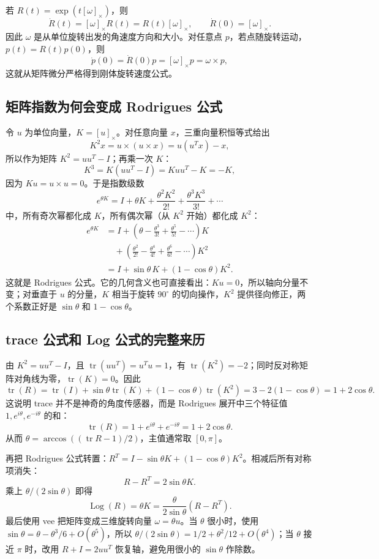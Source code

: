 \documentclass[UTF8,a4paper,11pt]{ctexart}
\newcommand{\Log}{\operatorname{Log}}
\newcommand{\hatmat}[1]{\left[#1\right]_{\times}}
\begin{document}
若 $R(t)=\exp(t\hatmat{\omega})$，则
\[
\dot R(t)=\hatmat{\omega}R(t)=R(t)\hatmat{\omega},
\qquad \dot R(0)=\hatmat{\omega}.
\]
因此 $\omega$ 是从单位旋转出发的角速度方向和大小。对任意点 $p$，若点随旋转运动，$p(t)=R(t)p(0)$，则
\[
\dot p(0)=\dot R(0)p=\hatmat{\omega}p=\omega\times p,
\]
这就从矩阵微分严格得到刚体旋转速度公式。

\subsection{矩阵指数为何会变成 Rodrigues 公式}
令 $u$ 为单位向量，$K=\hatmat{u}$。对任意向量 $x$，三重向量积恒等式给出
\[
K^2x=u\times(u\times x)=u(u^Tx)-x,
\]
所以作为矩阵 $K^2=uu^T-I$；再乘一次 $K$：
\[
K^3=K(uu^T-I)=Kuu^T-K=-K,
\]
因为 $Ku=u\times u=0$。于是指数级数
\[
e^{\theta K}=I+\theta K+\frac{\theta^2K^2}{2!}+\frac{\theta^3K^3}{3!}+\cdots
\]
中，所有奇次幂都化成 $K$，所有偶次幂（从 $K^2$ 开始）都化成 $K^2$：
\[
\begin{aligned}
e^{\theta K}
&=I+\left(\theta-\frac{\theta^3}{3!}+\frac{\theta^5}{5!}-\cdots\right)K\\
&\quad+\left(\frac{\theta^2}{2!}-\frac{\theta^4}{4!}+\frac{\theta^6}{6!}-\cdots\right)K^2\\
&=I+\sin\theta\,K+(1-\cos\theta)K^2.
\end{aligned}
\]
这就是 Rodrigues 公式。它的几何含义也可直接看出：$Ku=0$，所以轴向分量不变；对垂直于 $u$ 的分量，$K$ 相当于旋转 $90^\circ$ 的切向操作，$K^2$ 提供径向修正，两个系数正好是 $\sin\theta$ 和 $1-\cos\theta$。

\subsection{trace 公式和 Log 公式的完整来历}
由 $K^2=uu^T-I$，且 $\operatorname{tr}(uu^T)=u^Tu=1$，有 $\operatorname{tr}(K^2)=-2$；同时反对称矩阵对角线为零，$\operatorname{tr}(K)=0$。因此
\[
\operatorname{tr}(R)=\operatorname{tr}(I)+\sin\theta\operatorname{tr}(K)+(1-\cos\theta)\operatorname{tr}(K^2)
=3-2(1-\cos\theta)=1+2\cos\theta.
\]
这说明 trace 并不是神奇的角度传感器，而是 Rodrigues 展开中三个特征值 $1,e^{i\theta},e^{-i\theta}$ 的和：
\[
\operatorname{tr}(R)=1+e^{i\theta}+e^{-i\theta}=1+2\cos\theta.
\]
从而 $\theta=\arccos((\operatorname{tr}R-1)/2)$，主值通常取 $[0,\pi]$。

再把 Rodrigues 公式转置：$R^T=I-\sin\theta K+(1-\cos\theta)K^2$。相减后所有对称项消失：
\[
R-R^T=2\sin\theta K.
\]
乘上 $\theta/(2\sin\theta)$ 即得
\[
\Log(R)=\theta K=\frac{\theta}{2\sin\theta}(R-R^T).
\]
最后使用 vee 把矩阵变成三维旋转向量 $\omega=\theta u$。当 $\theta$ 很小时，使用 $\sin\theta=\theta-\theta^3/6+O(\theta^5)$，所以 $\theta/(2\sin\theta)=1/2+\theta^2/12+O(\theta^4)$；当 $\theta$ 接近 $\pi$ 时，改用 $R+I=2uu^T$ 恢复轴，避免用很小的 $\sin\theta$ 作除数。
\end{document}
